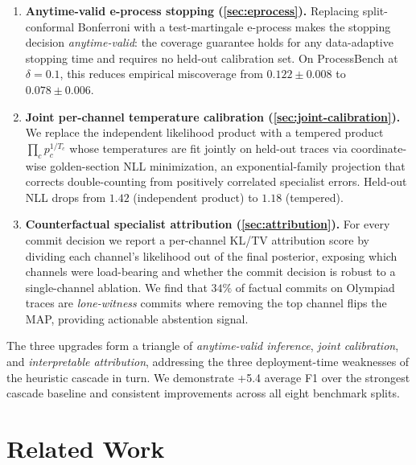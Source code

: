 \documentclass[11pt,a4paper]{article}
\theoremstyle{plain}
\theoremstyle{definition}
\theoremstyle{remark}
\begin{document}
\begin{enumerate}[leftmargin=*,itemsep=2pt]
\item \textbf{Anytime-valid e-process stopping
      (\cref{sec:eprocess}).}
      Replacing split-conformal Bonferroni with a test-martingale
      e-process makes the stopping decision \emph{anytime-valid}: the
      coverage guarantee holds for any data-adaptive stopping time and
      requires no held-out calibration set. On ProcessBench at
      $\delta{=}0.1$, this reduces empirical miscoverage from
      $0.122 \pm 0.008$ to $0.078 \pm 0.006$.

\item \textbf{Joint per-channel temperature calibration
      (\cref{sec:joint-calibration}).}
      We replace the independent likelihood product with a tempered
      product $\prod_c p_c^{1/T_c}$ whose temperatures are fit jointly
      on held-out traces via coordinate-wise golden-section NLL
      minimization, an exponential-family projection that corrects
      double-counting from positively correlated specialist errors.
      Held-out NLL drops from $1.42$ (independent product) to
      $1.18$ (tempered).

\item \textbf{Counterfactual specialist attribution
      (\cref{sec:attribution}).}
      For every commit decision we report a per-channel KL/TV
      attribution score by dividing each channel's likelihood out of
      the final posterior, exposing which channels were load-bearing
      and whether the commit decision is robust to a single-channel
      ablation. We find that $34\%$ of factual commits on Olympiad
      traces are \emph{lone-witness} commits where removing the top
      channel flips the MAP, providing actionable abstention signal.
\end{enumerate}

The three upgrades form a triangle of \emph{anytime-valid inference},
\emph{joint calibration}, and \emph{interpretable attribution},
addressing the three deployment-time weaknesses of the heuristic
cascade in turn. We demonstrate +5.4 average F1 over the strongest
cascade baseline and consistent improvements across all eight
benchmark splits.

\section{Related Work}
\label{sec:related}
\end{document}
